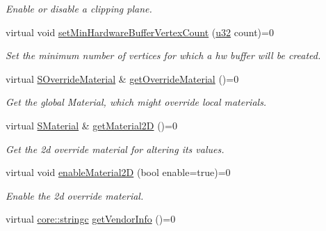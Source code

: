 \begin{DoxyCompactItemize}
\begin{DoxyCompactList}\small\item\em Enable or disable a clipping plane. \end{DoxyCompactList}\item 
virtual void \hyperlink{classirr_1_1video_1_1IVideoDriver_a79cbd1329b4206503e9a9593592502ea}{set\+Min\+Hardware\+Buffer\+Vertex\+Count} (\hyperlink{namespaceirr_a0416a53257075833e7002efd0a18e804}{u32} count)=0
\begin{DoxyCompactList}\small\item\em Set the minimum number of vertices for which a hw buffer will be created. \end{DoxyCompactList}\item 
virtual \hyperlink{structirr_1_1video_1_1SOverrideMaterial}{S\+Override\+Material} \& \hyperlink{classirr_1_1video_1_1IVideoDriver_af119ebfd02f99f77a463007277abf14a}{get\+Override\+Material} ()=0
\begin{DoxyCompactList}\small\item\em Get the global Material, which might override local materials. \end{DoxyCompactList}\item 
virtual \hyperlink{classirr_1_1video_1_1SMaterial}{S\+Material} \& \hyperlink{classirr_1_1video_1_1IVideoDriver_a198bbe60fdb1b5d6d0f4921e8a26109c}{get\+Material2D} ()=0
\begin{DoxyCompactList}\small\item\em Get the 2d override material for altering its values. \end{DoxyCompactList}\item 
virtual void \hyperlink{classirr_1_1video_1_1IVideoDriver_a7686a41fe0f506bb04c262f724f65756}{enable\+Material2D} (bool enable=true)=0
\begin{DoxyCompactList}\small\item\em Enable the 2d override material. \end{DoxyCompactList}\item 
virtual \hyperlink{namespaceirr_1_1core_ade1071a878633f2f6d8a75c5d11fec19}{core\+::stringc} \hyperlink{classirr_1_1video_1_1IVideoDriver_a221a3ee79676ad9fbebc39cf0150516e}{get\+Vendor\+Info} ()=0\hypertarget{classirr_1_1video_1_1IVideoDriver_a221a3ee79676ad9fbebc39cf0150516e}{}\label{classirr_1_1video_1_1IVideoDriver_a221a3ee79676ad9fbebc39cf0150516e}


\end{DoxyCompactItemize}
